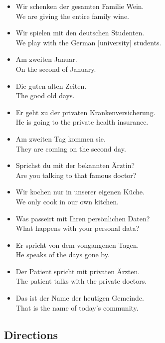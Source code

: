 \begin{itemize}
  \item  Wir schenken der gesamten Familie Wein. \\ We are giving the entire family wine.
	\item  Wir spielen mit den deutschen Studenten. \\ We play with the German [university] students.
	\item  Am zweiten Januar. \\ On the second of January.
	\item  Die guten alten Zeiten. \\ The good old days.
	\item  Er geht zu der privaten Krankenversicherung. \\ He is going to the private health insurance.
	\item  Am zweiten Tag kommen sie. \\ They are coming on the second day.
	\item  Sprichst du mit der bekannten {\"A}rztin? \\ Are you talking to that famous doctor?
	\item  Wir kochen nur in unserer eigenen K{\"u}che. \\ We only cook in our own kitchen.
	\item  Was passeirt mit Ihren pers{\"o}nlichen Daten? \\ What happens with your personal data?
	\item  Er spricht von dem vongangenen Tagen. \\ He speaks of the days gone by.
	\item  Der Patient spricht mit privaten {\"A}rzten. \\ The patient talks with the private doctors.
	\item  Das ist der Name der heutigen Gemeinde. \\ That is the name of today's community.
\end{itemize}

\pagebreak
\subsection{Directions}

